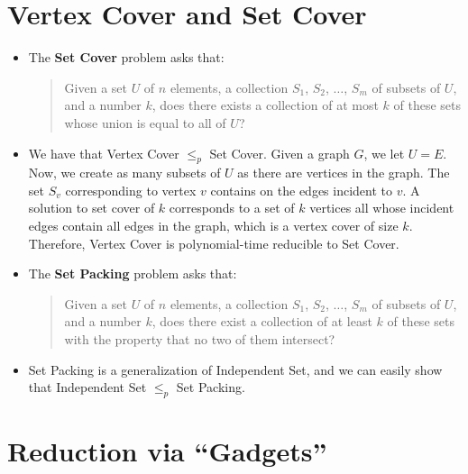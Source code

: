 \documentclass[10pt]{article}
\begin{document}
  \section{Vertex Cover and Set Cover} %
  \label{sec:vertex_cover_and_set_cover}
  
  \begin{itemize}
    \item The \textbf{Set Cover} problem asks that:
      \begin{quote}
        Given a set $U$ of $n$ elements, a collection $S_1$, $S_2$, $\dotsc$, $S_m$
        of subsets of $U$, and a number $k$, does there exists a collection of at
        most $k$ of these sets whose union is equal to all of $U$?
      \end{quote}
      
    \item We have that Vertex Cover $\leq_p$ Set Cover. Given a graph $G$, we let $U = E$.
      Now, we create as many subsets of $U$ as there are vertices in the graph. The set $S_v$
      corresponding to vertex $v$ contains on the edges incident to $v$. A solution to
      set cover of $k$ corresponds to a set of $k$ vertices all whose incident edges contain all edges
      in the graph, which is a vertex cover of size $k$. Therefore, Vertex Cover is polynomial-time
      reducible to Set Cover.
      
    \item The \textbf{Set Packing} problem asks that:
      \begin{quote}
        Given a set $U$ of $n$ elements, a collection $S_1$, $S_2$, $\dotsc$, $S_m$ of 
        subsets of $U$, and a number $k$, does there exist a collection of at least $k$
        of these sets with the property that no two of them intersect?
      \end{quote}
      
    \item Set Packing is a generalization of Independent Set, and we can easily show that
      Independent Set $\leq_p$ Set Packing.
  \end{itemize}
  
  \section{Reduction via ``Gadgets''} %
  \label{sec:reduction_via_gadgets_}
  
\end{document}
